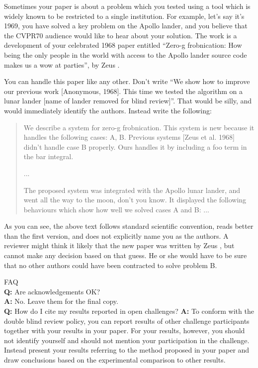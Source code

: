 \documentclass[10pt,twocolumn,letterpaper]{article}
\begin{document}
Sometimes your paper is about a problem which you tested using a tool which
is widely known to be restricted to a single institution.  For example,
let's say it's 1969, you have solved a key problem on the Apollo lander,
and you believe that the CVPR70 audience would like to hear about your
solution.  The work is a development of your celebrated 1968 paper entitled
``Zero-g frobnication: How being the only people in the world with access to
the Apollo lander source code makes us a wow at parties'', by Zeus \etal.

You can handle this paper like any other.  Don't write ``We show how to
improve our previous work [Anonymous, 1968].  This time we tested the
algorithm on a lunar lander [name of lander removed for blind review]''.
That would be silly, and would immediately identify the authors. Instead
write the following:
\begin{quotation}
   \noindent
   We describe a system for zero-g frobnication.  This
   system is new because it handles the following cases:
   A, B.  Previous systems [Zeus et al. 1968] didn't
   handle case B properly.  Ours handles it by including
   a foo term in the bar integral.

   ...

   The proposed system was integrated with the Apollo
   lunar lander, and went all the way to the moon, don't
   you know.  It displayed the following behaviours
   which show how well we solved cases A and B: ...
\end{quotation}
As you can see, the above text follows standard scientific convention,
reads better than the first version, and does not explicitly name you as
the authors.  A reviewer might think it likely that the new paper was
written by Zeus \etal, but cannot make any decision based on that guess.
He or she would have to be sure that no other authors could have been
contracted to solve problem B.
\medskip

\noindent
FAQ\medskip\\
{\bf Q:} Are acknowledgements OK?\\
{\bf A:} No.  Leave them for the final copy.\medskip\\
{\bf Q:} How do I cite my results reported in open challenges?
{\bf A:} To conform with the double blind review policy, you can report results of other challenge participants together with your results in your paper. For your results, however, you should not identify yourself and should not mention your participation in the challenge. Instead present your results referring to the method proposed in your paper and draw conclusions based on the experimental comparison to other results.\medskip\\
\end{document}
